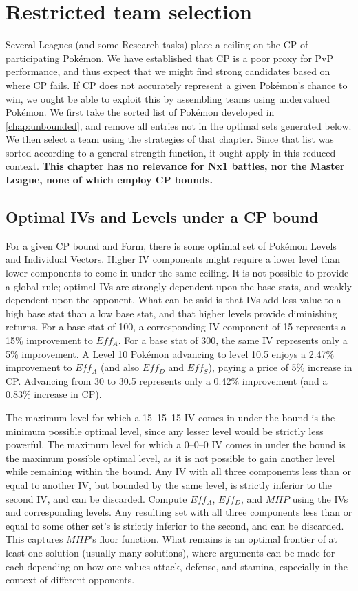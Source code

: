 \chapter{Restricted team selection}
\label{chap:bounded}
Several Leagues (and some Research tasks) place a ceiling on the CP of
 participating Pokémon.
We have established that CP is a poor proxy for PvP performance, and thus
 expect that we might find strong candidates based on where CP fails.
If CP does not accurately represent a given Pokémon's chance to win, we ought
 be able to exploit this by assembling teams using undervalued Pokémon.
We first take the sorted list of Pokémon developed in \autoref{chap:unbounded},
 and remove all entries not in the optimal sets generated below.
We then select a team using the strategies of that chapter. Since
 that list was sorted according to a general strength function, it
 ought apply in this reduced context.
\textbf{This chapter has no relevance for Nx1 battles, nor the Master
  League, none of which employ CP bounds.}

\section{Optimal IVs and Levels under a CP bound}
For a given CP bound and Form, there is some optimal set of Pokémon Levels
 and Individual Vectors.
Higher IV components might require a lower level than lower components to
 come in under the same ceiling.
It is not possible to provide a global rule; optimal IVs are strongly
 dependent upon the base stats, and weakly dependent upon the opponent.
What can be said is that IVs add less value to a high base stat than a low
 base stat, and that higher levels provide diminishing returns.
For a base stat of 100, a corresponding IV component of 15 represents a
 15\% improvement to $Eff_A$.
For a base stat of 300, the same IV represents only a 5\% improvement.
A Level 10 Pokémon advancing to level 10.5 enjoys a 2.47\% improvement to
 $Eff_A$ (and also $Eff_D$ and $Eff_S$), paying a price of 5\% increase
 in CP.
Advancing from 30 to 30.5 represents only a 0.42\% improvement (and a
 0.83\% increase in CP).

The maximum level for which a 15--15--15 IV comes in under the bound is the
 minimum possible optimal level, since any lesser level would be strictly less
 powerful.
The maximum level for which a 0--0--0 IV comes in under the bound is the
 maximum possible optimal level, as it is not possible to gain another level
 while remaining within the bound.
Any IV with all three components less than or equal to another IV, but bounded
 by the same level, is strictly inferior to the second IV, and can be discarded.
Compute $Eff_A$, $Eff_D$, and $MHP$ using the IVs and corresponding levels.
Any resulting set with all three components less than or equal to some other set's
 is strictly inferior to the second, and can be discarded.
This captures $MHP$'s floor function.
What remains is an optimal frontier of at least one solution (usually
 many solutions), where arguments can be made for each depending on how one
 values attack, defense, and stamina, especially in the context of different
 opponents.

